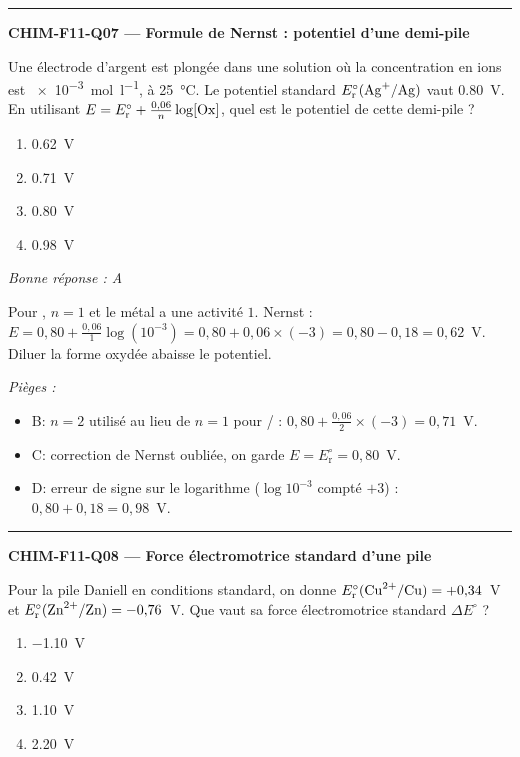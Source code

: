 \documentclass[11pt,a4paper]{article}
\begin{document}
\vspace{8pt}\hrule\vspace{8pt}
\noindent\textbf{CHIM-F11-Q07 --- Formule de Nernst : potentiel d'une demi-pile}\par
Une électrode d'argent est plongée dans une solution où la concentration en ions  est \qty{e-3}{\mole\per\litre}, à \qty{25}{\celsius}. Le potentiel standard $E^\circ_{\mathrm{r}}(\ce{Ag+}/\ce{Ag})$ vaut \qty{+0.80}{\volt}. En utilisant $E=E^\circ_{\mathrm{r}}+\frac{0{,}06}{n}\log[\ce{Ox}]$, quel est le potentiel de cette demi-pile ?
\begin{enumerate}[label=\Alph*)]
\item \qty{0.62}{\volt}
\item \qty{0.71}{\volt}
\item \qty{0.80}{\volt}
\item \qty{0.98}{\volt}
\end{enumerate}
\textit{Bonne réponse : A}\par
Pour , $n=1$ et le métal  a une activité $1$. Nernst : $E=0{,}80+\frac{0{,}06}{1}\log(10^{-3})=0{,}80+0{,}06\times(-3)=0{,}80-0{,}18=0{,}62$~V. Diluer la forme oxydée abaisse le potentiel.\par
\textit{Pièges :}
\begin{itemize}
\item B: $n=2$ utilisé au lieu de $n=1$ pour / : $0{,}80+\frac{0{,}06}{2}\times(-3)=0{,}71$~V.
\item C: correction de Nernst oubliée, on garde $E=E^\circ_{\mathrm{r}}=0{,}80$~V.
\item D: erreur de signe sur le logarithme ($\log 10^{-3}$ compté $+3$) : $0{,}80+0{,}18=0{,}98$~V.
\end{itemize}
\vspace{8pt}\hrule\vspace{8pt}
\noindent\textbf{CHIM-F11-Q08 --- Force électromotrice standard d'une pile}\par
Pour la pile Daniell  en conditions standard, on donne $E^\circ_{\mathrm{r}}(\ce{Cu^{2+}}/\ce{Cu})=+0{,}34$~V et $E^\circ_{\mathrm{r}}(\ce{Zn^{2+}}/\ce{Zn})=-0{,}76$~V. Que vaut sa force électromotrice standard $\Delta E^\circ$ ?
\begin{enumerate}[label=\Alph*)]
\item \qty{-1.10}{\volt}
\item \qty{0.42}{\volt}
\item \qty{1.10}{\volt}
\item \qty{2.20}{\volt}
\end{enumerate}
\end{document}

